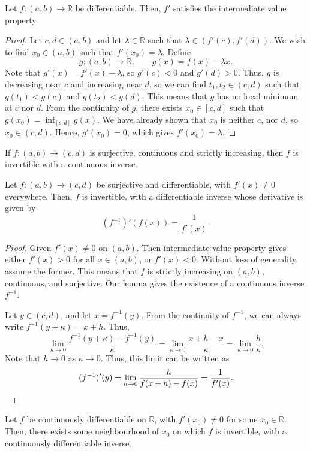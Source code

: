 \documentclass[11pt]{article}
\def\R{\mathbb{R}}
\theoremstyle{definition}
\theoremstyle{remark}
\numberwithin{equation}{module}
\begin{document}
    \begin{theorem}
        Let $f\colon (a, b)\to \R$ be differentiable. Then, $f'$ satisfies the
        intermediate value property.
    \end{theorem}
    \begin{proof}
        Let $c, d \in (a, b)$ and let $\lambda \in \R$ such that $\lambda \in
        (f'(c), f'(d))$. We wish to find $x_0 \in (a, b)$ such that $f'(x_0) =
        \lambda$. Define \[
            g\colon (a, b) \to \R, \qquad g(x) = f(x) - \lambda x.
        \] Note that $g'(x) = f'(x) - \lambda$, so $g'(c) < 0$ and $g'(d) > 0$.
        Thus, $g$ is decreasing near $c$ and increasing near $d$, so we can find
        $t_1, t_2 \in (c, d)$ such that $g(t_1) < g(c)$ and $g(t_2) < g(d)$.
        This means that $g$ has no local minimum at $c$ nor $d$. From the continuity
        of $g$, there exists $x_0 \in [c, d]$ such that $g(x_0) = \inf_{[c, d]}
        g(x)$. We have already shown that $x_0$ is neither $c$, nor $d$, so $x_0 \in
        (c, d)$. Hence, $g'(x_0) = 0$, which gives $f'(x_0) = \lambda$.
    \end{proof}
    
    \begin{lemma}
        If $f\colon (a, b) \to (c, d)$ is surjective, continuous and
        strictly increasing, then $f$ is invertible with a continuous inverse.
    \end{lemma}
    \begin{theorem}
        Let $f\colon (a, b) \to (c, d)$ be surjective and differentiable, with 
        $f'(x) \neq 0$ everywhere. Then, $f$ is invertible, with a differentiable 
        inverse whose derivative is given by \[
            (f^{-1})'(f(x)) = \frac{1}{f'(x)}.
        \] 
    \end{theorem}
    \begin{proof}
        Given $f'(x) \neq 0$ on $(a, b)$. Then intermediate value property gives
        either $f'(x) > 0$ for all $x \in (a, b)$, or $f'(x) < 0$. Without loss of
        generality, assume the former. This means that $f$ is strictly increasing on
        $(a, b)$, continuous, and surjective. Our lemma gives the existence of a
        continuous inverse $f^{-1}$.

        Let $y \in (c, d)$, and let $x = f^{-1}(y)$. From the continuity of
        $f^{-1}$, we can always write $f^{-1}(y + \kappa) = x + h$. Thus, \[
            \lim_{\kappa \to 0} \frac{f^{-1}(y + \kappa) - f^{-1}(y)}{\kappa} =
            \lim_{\kappa \to 0} \frac{x + h - x}{\kappa} = \lim_{\kappa \to 0}
            \frac{h}{\kappa}.
        \] Note that $h \to 0$ as $\kappa \to 0$. Thus, this limit can be written as
        \[
            (f^{-1})'(y) = \lim_{h \to 0} \frac{h}{f(x + h) - f(x)} =
            \frac{1}{f'(x)}. \qedhere
        \]
    \end{proof}
    \begin{corollary}
        Let $f$ be continuously differentiable on $\R$, with $f'(x_0) \neq 0$ for
        some $x_0 \in \R$. Then, there exists some neighbourhood of $x_0$ on which
        $f$ is invertible, with a continuously differentiable inverse.
    \end{corollary}
    
\end{document}

